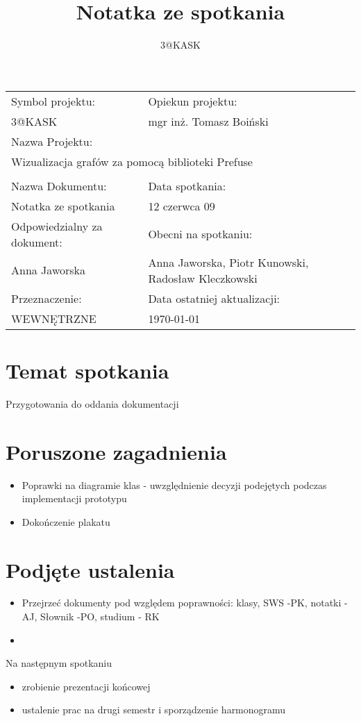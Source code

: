 \documentclass[a4paper,10pt]{article}
\title{Notatka ze spotkania}
\author{3@KASK}
\begin{document}



\maketitle


\begin{center}
\begin{tabular}{|p{7cm}|p{7cm}|}
\hline
Symbol projektu: & Opiekun projektu:   \tabularnewline 
3@KASK & mgr inż. Tomasz Boiński    \tabularnewline \hline
\multicolumn{2}{|l|}{Nazwa Projektu: } \tabularnewline
\multicolumn{2}{|l|}{Wizualizacja grafów za pomocą biblioteki Prefuse } \tabularnewline 
\hline
\multicolumn{2}{l}{ } \tabularnewline %
\hline 
Nazwa Dokumentu: & Data spotkania:   \tabularnewline 
Notatka ze spotkania & 12 czerwca 09 \tabularnewline \hline
Odpowiedzialny za dokument: & Obecni na spotkaniu:   \tabularnewline 
Anna Jaworska & Anna Jaworska, Piotr Kunowski, Radosław Kleczkowski  \tabularnewline \hline
Przeznaczenie: & Data ostatniej aktualizacji:   \tabularnewline 
WEWNĘTRZNE & \today \tabularnewline \hline
\end{tabular}
\end{center}



\section{Temat spotkania}

Przygotowania do oddania dokumentacji

\section{Poruszone zagadnienia}
\begin{itemize}
 \item Poprawki na diagramie klas - uwzględnienie decyzji podejętych podczas implementacji prototypu
\item Dokończenie plakatu
\end{itemize}


\section{Podjęte ustalenia}
\begin{itemize}
 \item Przejrzeć dokumenty pod względem poprawności: klasy, SWS -PK, notatki -AJ, Słownik -PO, studium - RK
\item 
\end{itemize}


Na następnym spotkaniu
\begin{itemize}
 \item zrobienie prezentacji końcowej
 \item ustalenie prac na drugi semestr i sporządzenie harmonogramu
\end{itemize}



\newpage
\tableofcontents
\newpage


\clearpage
{}
{}

\end{document}
